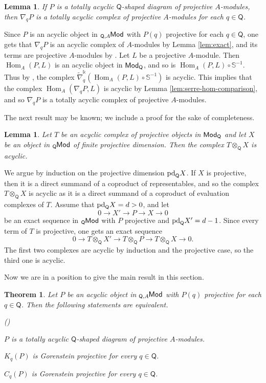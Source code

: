 \documentclass{amsart}
\theoremstyle{bfupright head,slanted body}
\theoremstyle{bfupright head,upright body}
\theoremstyle{fixed bf head,slanted body}
\newtheorem{thm}[res]{Theorem}          \newtheorem*{thm*}{Theorem}
\newtheorem{lem}[res]{Lemma}            \newtheorem*{lem*}{Lemma}
\theoremstyle{fixed bf head,upright body}
\theoremstyle{numbered paragraph}
\newlength{\thmlistleft}        %
\newlength{\thmlistright}       %
\newlength{\thmlistpartopsep}   %
\newlength{\thmlisttopsep}      %
\newlength{\thmlistparsep}      %
\newlength{\thmlistitemsep}     %
\newcounter{eqc}
\newenvironment{eqc}{\begin{list}{\upshape (\textit{\roman{eqc}})}%
		{\usecounter{eqc}%
			\setlength{\leftmargin}{\thmlistleft}%
			\setlength{\labelwidth}{\thmlistleft}%
			\setlength{\rightmargin}{\thmlistright}%
			\setlength{\partopsep}{\thmlistpartopsep}%
			\setlength{\topsep}{\thmlisttopsep}%
			\setlength{\parsep}{\thmlistparsep}%
			\setlength{\itemsep}{\thmlistitemsep}}}%
	{\end{list}}%
\newenvironment{prf*}[1][Proof]{%
	\begin{proof}[\bf #1]
		\setcounter{equation}{0}
		\renewcommand{\theequation}{\arabic{equation}}}
	{\end{proof}
}
\numberwithin{equation}{res}
\newcommand{\Hom}{\operatorname{Hom}}
\newcommand{\Q}{\mathsf{Q}}
\newcommand{\pd}{\mbox{\rm pd}}
\newcommand{\kk}{\Bbbk}
\newcommand{\lMod}[1]{{}_{#1}\mspace{-1mu}{\sf{Mod}}}
\newcommand{\rMod}[1]{{\sf{Mod}}_{#1}}
\begin{document}
\begin{lem}\label{lem:tacyclic}
If $P$ is a totally acyclic $\Q$-shaped diagram of projective $A$-modules, then $\nabla_qP$ is a totally acyclic complex of projective $A$-modules for each $q\in\Q$.
\end{lem}
\begin{prf*}
Since $P$ is an acyclic object in $\lMod{\Q,A}$ with $P(q)$ projective for each $q\in\Q$, one gets that $\nabla_qP$ is an acyclic complex of $A$-modules by Lemma \ref{lem:exact}, and its terms are projective $A$-modules by \cite[Lemma 3.5$(ii)$]{HJ26}. Let $L$ be a projective $A$-module. Then $\Hom_A(P,L)$ is an acyclic object in $\rMod{\Q}$, and so is $\Hom_A(P,L)\circ\mathbb S^{-1}$. Thus by \cite[Lemma 3.12]{HJ26}, the complex $\widetilde{\nabla}_q^{\kk}(\Hom_A(P,L)\circ\mathbb S^{-1})$ is acyclic. This implies that the complex $\Hom_A(\nabla_qP,L)$ is acyclic by Lemma \ref{lem:serre-hom-comparison}, and so $\nabla_qP$ is a totally acyclic complex of projective
$A$-modules.
\end{prf*}

The next result may be known; we include a proof for the sake of completeness.

\begin{lem}\label{lem:finite-dimension-test}
Let $T$ be an acyclic complex of projective objects in $\rMod{\Q}$ and let $X$ be an object in $\lMod{\Q}$ of finite projective dimension. Then the complex $T\otimes_{\Q}X$ is acyclic.
\end{lem}

\begin{prf*}
We argue by induction on the projective dimension $\pd_{\Q}X$. If $X$ is projective, then it is a direct summand of a coproduct of representables, and so the complex $T\otimes_{\Q}X$ is acyclic as it is a direct summand of a coproduct of evaluation complexes of $T$. Assume that $\pd_{\Q}X=d>0$, and let
$$0\to X'\to P\to X\to 0$$
be an exact sequence in $\lMod{\Q}$ with $P$ projective and $\pd_{\Q}X'=d-1$. Since every term of $T$ is projective, one gets an exact sequence
$$0\to T\otimes_{\Q}X'\to T\otimes_{\Q}P\to T\otimes_{\Q}X\to 0.$$
The first two complexes are acyclic by induction and the projective case, so the third one is acyclic.
\end{prf*}

Now we are in a position to give the main result in this section.

\begin{thm}\label{thm:totally-acyclic-characterization}
Let $P$ be an acyclic object in $\lMod{\Q,A}$ with $P(q)$ projective for each $q\in\Q$. Then the following statements are equivalent.
\begin{eqc}
\item $P$ is a totally acyclic $\Q$-shaped diagram of projective $A$-modules.
\item $K_q(P)$ is Gorenstein projective for every $q\in\Q$.
\item $C_q(P)$ is Gorenstein projective for every $q\in\Q$.
\end{eqc}
\end{thm}
\end{document}
